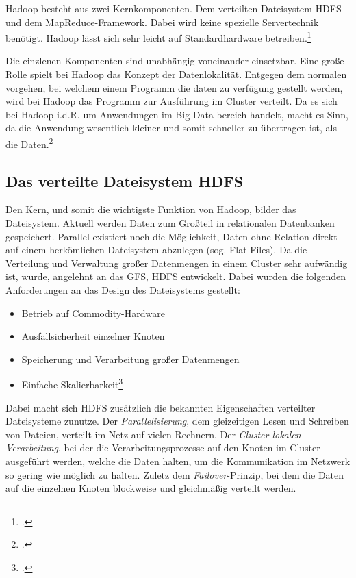 Hadoop besteht aus zwei Kernkomponenten. Dem verteilten Dateisystem \ac{HDFS} und dem MapReduce-Framework. Dabei wird keine spezielle Servertechnik benötigt. Hadoop lässt sich sehr leicht auf Standardhardware betreiben.\footcite[Vgl.][S. 19-22]{Wartala.2012}

Die einzlenen Komponenten sind unabhängig voneinander einsetzbar. Eine große Rolle spielt bei Hadoop das Konzept der Datenlokalität. Entgegen dem normalen vorgehen, bei welchem einem Programm die daten zu verfügung gestellt werden, wird bei Hadoop das Programm zur Ausführung im Cluster verteilt. Da es sich bei Hadoop i.d.R. um Anwendungen im Big Data bereich handelt, macht es Sinn, da die Anwendung wesentlich kleiner und somit schneller zu übertragen ist, als die Daten.\footcite[Vgl.][S. 20]{Freiknecht.2014}

\subsection{Das verteilte Dateisystem HDFS}\label{subsec:DasVerteilteDateisystemHDFS}
Den Kern, und somit die wichtigste Funktion von Hadoop, bilder das Dateisystem. Aktuell werden Daten zum Großteil in relationalen Datenbanken gespeichert. Parallel existiert noch die Möglichkeit, Daten ohne Relation direkt auf einem herkömlichen Dateisystem abzulegen (sog. Flat-Files). Da die Verteilung und Verwaltung großer Datenmengen in einem Cluster sehr aufwändig ist, wurde, angelehnt an das \ac{GFS}, \ac{HDFS} entwickelt. Dabei wurden die folgenden Anforderungen an das Design des Dateisystems gestellt:

\begin{itemize}
	\item Betrieb auf \gls{Commodity-Hardware}
	\item Ausfallsicherheit einzelner Knoten
	\item Speicherung und Verarbeitung großer Datenmengen
	\item Einfache Skalierbarkeit\footcite[Vgl.][S. 21]{Freiknecht.2014}
\end{itemize}

Dabei macht sich \ac{HDFS} zusätzlich die bekannten Eigenschaften verteilter Dateisysteme zunutze. Der \textit{Parallelisierung}, dem gleizeitigen Lesen und Schreiben von Dateien, verteilt im Netz auf vielen Rechnern. Der \textit{Cluster-lokalen Verarbeitung}, bei der die Verarbeitungsprozesse auf den Knoten im Cluster ausgeführt werden, welche die Daten halten, um die Kommunikation im Netzwerk so gering wie möglich zu halten. Zuletz dem \textit{Failover}-Prinzip, bei dem die Daten auf die einzelnen Knoten blockweise und gleichmäßig verteilt werden.

